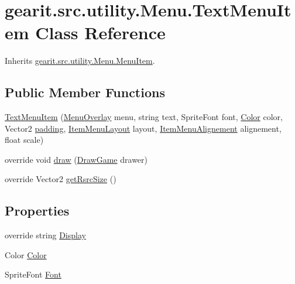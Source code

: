 \hypertarget{classgearit_1_1src_1_1utility_1_1_menu_1_1_text_menu_item}{\section{gearit.\+src.\+utility.\+Menu.\+Text\+Menu\+Item Class Reference}
\label{classgearit_1_1src_1_1utility_1_1_menu_1_1_text_menu_item}
}


Inherits \hyperlink{classgearit_1_1src_1_1utility_1_1_menu_1_1_menu_item}{gearit.\+src.\+utility.\+Menu.\+Menu\+Item}.

\subsection*{Public Member Functions}
\begin{DoxyCompactItemize}
\item 
\hyperlink{classgearit_1_1src_1_1utility_1_1_menu_1_1_text_menu_item_a6b75fa6b220178f33f50cba0836fea47}{Text\+Menu\+Item} (\hyperlink{classgearit_1_1src_1_1utility_1_1_menu_1_1_menu_overlay}{Menu\+Overlay} menu, string text, Sprite\+Font font, \hyperlink{classgearit_1_1src_1_1utility_1_1_menu_1_1_text_menu_item_acecb216bb3768748d16cafc181a8b459}{Color} color, Vector2 \hyperlink{classgearit_1_1src_1_1utility_1_1_menu_1_1_menu_item_ae2a8172ef48a64fbb99dfca22e9995ab}{padding}, \hyperlink{namespacegearit_1_1src_1_1utility_1_1_menu_a3ca3e98c7e2f44227e0fd6263822c56a}{Item\+Menu\+Layout} layout, \hyperlink{namespacegearit_1_1src_1_1utility_1_1_menu_a4312fcb06a1685782d1246bfeefdbd3b}{Item\+Menu\+Alignement} alignement, float scale)
\item 
override void \hyperlink{classgearit_1_1src_1_1utility_1_1_menu_1_1_text_menu_item_a700f5c274206c131cb194ba98df47eb0}{draw} (\hyperlink{classgearit_1_1src_1_1_draw_game}{Draw\+Game} drawer)
\item 
override Vector2 \hyperlink{classgearit_1_1src_1_1utility_1_1_menu_1_1_text_menu_item_abb0196ade5cd9cc7e9d099df40777012}{get\+Rsrc\+Size} ()
\end{DoxyCompactItemize}
\subsection*{Properties}
\begin{DoxyCompactItemize}
\item 
override string \hyperlink{classgearit_1_1src_1_1utility_1_1_menu_1_1_text_menu_item_a64b7bfba86e8afcd9efcc91f579aa07e}{Display}
\item 
Color \hyperlink{classgearit_1_1src_1_1utility_1_1_menu_1_1_text_menu_item_acecb216bb3768748d16cafc181a8b459}{Color}
\item 
Sprite\+Font \hyperlink{classgearit_1_1src_1_1utility_1_1_menu_1_1_text_menu_item_a2d37ec61a361d7c19864ab284c0f8bd4}{Font}
\end{DoxyCompactItemize}
